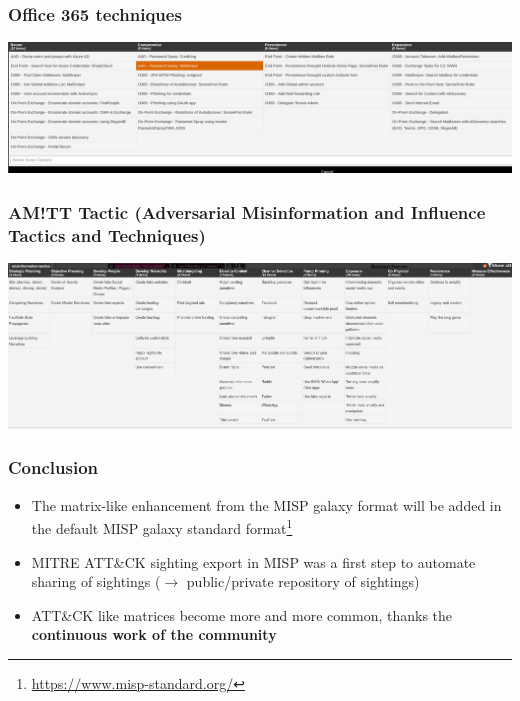 \begin{frame}
  \frametitle{Office 365 techniques}
  \includegraphics[scale=0.3]{office.png}
\end{frame}

\begin{frame}
  \frametitle{AM!TT Tactic (Adversarial Misinformation and Influence Tactics and Techniques)}
  \includegraphics[scale=0.3]{amitt.png}
\end{frame}

\begin{frame}
        \frametitle{Conclusion}
        \begin{itemize}
                \item The matrix-like enhancement from the MISP galaxy format will be added in the default MISP galaxy standard format\footnote{\url{https://www.misp-standard.org/}}
                \item MITRE ATT\&CK sighting export in MISP was a first step to automate sharing of sightings ($\rightarrow$ public/private repository of sightings)
                \item ATT\&CK like matrices become more and more common, thanks the {\bf continuous work of the community}
        \end{itemize}
\end{frame}

